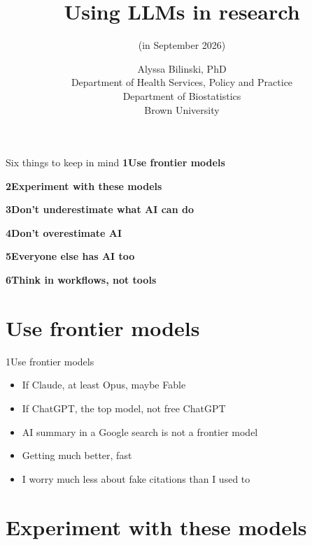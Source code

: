 \documentclass[11pt]{beamer}
\newcommand{\rmapnum}[1]{\textcolor{brownred}{\textbf{#1}}}
\begin{document}
\title[Using LLMs in research]{Using LLMs in research}
\subtitle{(in September 2026)}
\author[Bilinski]{%
\small
Alyssa Bilinski, PhD \\[6pt]
\footnotesize
Department of Health Services, Policy and Practice \\
Department of Biostatistics \\
Brown University}
\date{}
\titlegraphic{}
\begin{frame}[plain]
\titlepage
\end{frame}


\begin{frame}{Six things to keep in mind}
\vfill
\pause
{\large\rmapnum{1}\quad\textbf{Use frontier models}}\par
\vfill
\pause
{\large\rmapnum{2}\quad\textbf{Experiment with these models}}\par
\vfill
\pause
{\large\rmapnum{3}\quad\textbf{Don't underestimate what AI can do}}\par
\vfill
\pause
{\large\rmapnum{4}\quad\textbf{Don't overestimate AI}}\par
\vfill
\pause
{\large\rmapnum{5}\quad\textbf{Everyone else has AI too}}\par
\vfill
\pause
{\large\rmapnum{6}\quad\textbf{Think in workflows, not tools}}\par
\vfill
\end{frame}


\section{Use frontier models}

\begin{transition}{1}{Use frontier models}
\pause
\begin{itemize}\setlength\itemsep{8pt}
\item If Claude, at least Opus, maybe Fable \pause
\item If ChatGPT, the top model, not free ChatGPT \pause
\item AI summary in a Google search is not a frontier model \pause
\item Getting much better, fast \pause
\item I worry much less about fake citations than I used to
\end{itemize}
\end{transition}


\section{Experiment with these models}
\end{document}
